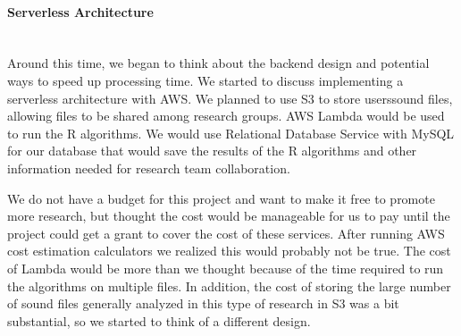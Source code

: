 \paragraph{Serverless Architecture} \mbox{}\\[\paragraphheaderspace]
Around this time, we began to think about the backend design and potential ways to speed up processing time. We started to discuss implementing a serverless architecture with AWS. We planned to use S3 to store users\textquotesingle sound files, allowing files to be shared among research groups. AWS Lambda would be used to run the R algorithms. We would use Relational Database Service with MySQL for our database that would save the results of the R algorithms and other information needed for research team collaboration.\par
We do not have a budget for this project and want to make it free to promote more research, but thought the cost would be manageable for us to pay until the project could get a grant to cover the cost of these services. After running AWS cost estimation calculators we realized this would probably not be true. The cost of Lambda would be more than we thought because of the time required to run the algorithms on multiple files. In addition, the cost of storing the large number of sound files generally analyzed in this type of research in S3 was a bit substantial, so we started to think of a different design.\par

